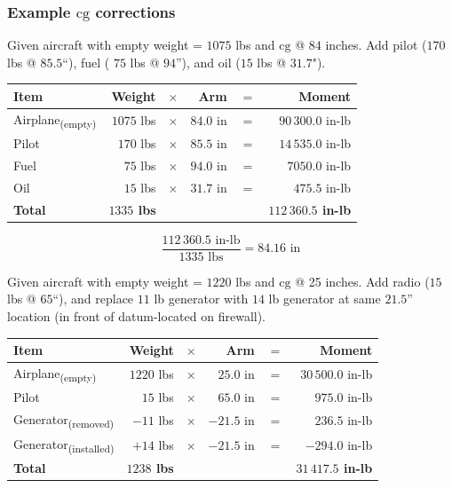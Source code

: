 \documentclass[
]{book}
\begin{document}
\hypertarget{example-mathrmcg-corrections}{%
\subsubsection*{\texorpdfstring{Example \(\mathrm{cg}\) corrections}{Example \textbackslash mathrm\{cg\} corrections}}\label{example-mathrmcg-corrections}}

Given aircraft with empty weight = \(1075\) lbs and \(\mathrm{cg}\) @ \(84\) inches. Add pilot (\(170\) lbs @ \(85.5\)``), fuel ( \(75\) lbs @ \(94\)''), and oil (\(15\) lbs @ \(31.7\)").

\begin{longtable}[]{@{}lrrrrr@{}}
\toprule
Item & Weight & \(\times\) & Arm & \(=\) & Moment\tabularnewline
\midrule
\endhead
Airplane\textsubscript{(empty)} & \(1075\) lbs & \(\times\) & \(84.0\) in & \(=\) & \(90\,300.0\) in-lb\tabularnewline
Pilot & \(170\) lbs & \(\times\) & \(85.5\) in & \(=\) & \(14\,535.0\) in-lb\tabularnewline
Fuel & \(75\) lbs & \(\times\) & \(94.0\) in & \(=\) & \(7050.0\) in-lb\tabularnewline
Oil & \(15\) lbs & \(\times\) & \(31.7\) in & \(=\) & \(475.5\) in-lb\tabularnewline
\textbf{Total} & \textbf{\(1335\) lbs} & & & & \textbf{\(112\,360.5\) in-lb}\tabularnewline
\bottomrule
\end{longtable}

\[\frac{112\,360.5 \text{ in-lb}}{1335 \text{ lbs}} = 84.16 \text{ in} \]

Given aircraft with empty weight = \(1220\) lbs and \(\mathrm{cg}\) @ 25 inches. Add radio (\(15\) lbs @ \(65\)``), and replace \(11\) lb generator with \(14\) lb generator at same \(21.5\)'' location (in front of datum-located on firewall).

\begin{longtable}[]{@{}lrrrrr@{}}
\toprule
Item & Weight & \(\times\) & Arm & \(=\) & Moment\tabularnewline
\midrule
\endhead
Airplane\textsubscript{(empty)} & \(1220\) lbs & \(\times\) & \(25.0\) in & \(=\) & \(30\,500.0\) in-lb\tabularnewline
Pilot & \(15\) lbs & \(\times\) & \(65.0\) in & \(=\) & \(975.0\) in-lb\tabularnewline
Generator\textsubscript{(removed)} & \(-11\) lbs & \(\times\) & \(-21.5\) in & \(=\) & \(236.5\) in-lb\tabularnewline
Generator\textsubscript{(installed)} & \(+14\) lbs & \(\times\) & \(-21.5\) in & \(=\) & \(-294.0\) in-lb\tabularnewline
\textbf{Total} & \textbf{\(1238\) lbs} & & & & \textbf{\(31\,417.5\) in-lb}\tabularnewline
\bottomrule
\end{longtable}
\end{document}
